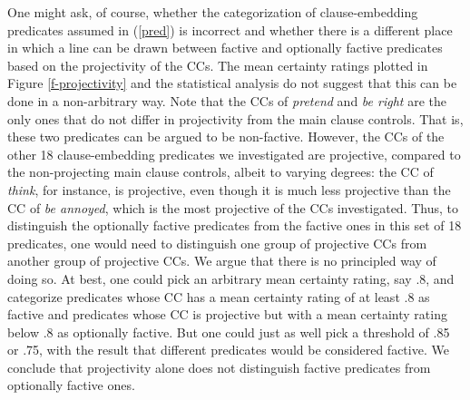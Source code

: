 \documentclass[11pt,fleqn]{article}
\newcommand{\6}{\mbox{$[\hspace*{-.6mm}[$}}
\newcommand{\9}{\mbox{$]\hspace*{-.6mm}]$}}
\begin{document}
One might ask, of course, whether the categorization of clause-embedding predicates assumed in (\ref{pred}) is incorrect and whether there is a different place in which a line can be drawn between factive and optionally factive predicates based on the projectivity of the CCs. The mean certainty ratings plotted in Figure \ref{f-projectivity} and the statistical analysis do not suggest that this can be done in a non-arbitrary way. Note that the CCs of {\em pretend} and {\em be right} are the only ones that do not differ in projectivity from the main clause controls. That is, these two predicates can be argued to be non-factive. However, the CCs of the other 18 clause-embedding predicates we investigated are projective, compared to the non-projecting main clause controls, albeit to varying degrees: the CC of {\em think}, for instance, is projective, even though it is much less projective than the CC of {\em be annoyed}, which is the most projective of the CCs investigated. Thus, to distinguish the optionally factive predicates from the factive ones in this set of 18 predicates, one would need to distinguish one group of projective CCs from another group of projective CCs. We argue that there is no principled way of doing so. At best, one could pick an arbitrary mean certainty rating, say .8, and categorize predicates whose CC has a mean certainty rating of at least .8 as factive and predicates whose CC is projective but with a mean certainty rating below .8 as optionally factive. But one could just as well pick a threshold of .85 or .75, with the result that different predicates would be considered factive. We conclude that projectivity alone does not distinguish factive predicates from optionally factive ones. 
\end{document}
